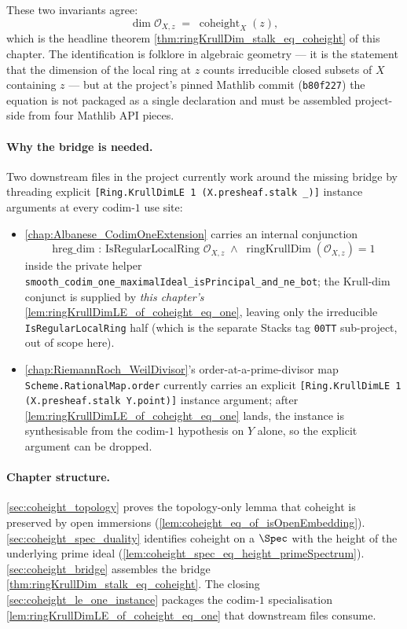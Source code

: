 These two invariants agree:
\[
  \dim \mathcal{O}_{X,z} \;=\; \operatorname{coheight}_X(z),
\]
which is the headline theorem \cref{thm:ringKrullDim_stalk_eq_coheight} of this
chapter. The identification is folklore in algebraic geometry --- it is the
statement that the dimension of the local ring at \(z\) counts irreducible
closed subsets of \(X\) containing \(z\) --- but at the project's pinned Mathlib
commit (\texttt{b80f227}) the equation is not packaged as a single declaration
and must be assembled project-side from four Mathlib API pieces.

\paragraph{Why the bridge is needed.} Two downstream files in the project
currently work around the missing bridge by threading explicit
\texttt{[Ring.KrullDimLE 1 (X.presheaf.stalk \_)]} instance arguments at every
codim-\(1\) use site:
\begin{itemize}
  \item \cref{chap:Albanese_CodimOneExtension} carries an internal conjunction
    \[
      \text{hreg\_dim : IsRegularLocalRing\ } \mathcal{O}_{X,z} \;\wedge\;
      \operatorname{ringKrullDim}(\mathcal{O}_{X,z}) = 1
    \]
    inside the private helper
    \texttt{smooth\_codim\_one\_maximalIdeal\_isPrincipal\_and\_ne\_bot};
    the Krull-dim conjunct is supplied by \emph{this chapter's}
    \cref{lem:ringKrullDimLE_of_coheight_eq_one}, leaving only the
    irreducible \texttt{IsRegularLocalRing} half (which is the separate
    Stacks tag \texttt{00TT} sub-project, out of scope here).
  \item \cref{chap:RiemannRoch_WeilDivisor}'s order-at-a-prime-divisor map
    \texttt{Scheme.RationalMap.order} currently carries an explicit
    \texttt{[Ring.KrullDimLE 1 (X.presheaf.stalk Y.point)]} instance argument;
    after \cref{lem:ringKrullDimLE_of_coheight_eq_one} lands, the instance is
    synthesisable from the codim-\(1\) hypothesis on \(Y\) alone, so the explicit
    argument can be dropped.
\end{itemize}

\paragraph{Chapter structure.} \cref{sec:coheight_topology} proves the
topology-only lemma that coheight is preserved by open immersions
(\cref{lem:coheight_eq_of_isOpenEmbedding}). \cref{sec:coheight_spec_duality}
identifies coheight on a \(\Spec\) with the height of the underlying prime ideal
(\cref{lem:coheight_spec_eq_height_primeSpectrum}). \cref{sec:coheight_bridge}
assembles the bridge \cref{thm:ringKrullDim_stalk_eq_coheight}. The closing
\cref{sec:coheight_le_one_instance} packages the codim-\(1\) specialisation
\cref{lem:ringKrullDimLE_of_coheight_eq_one} that downstream files consume.

